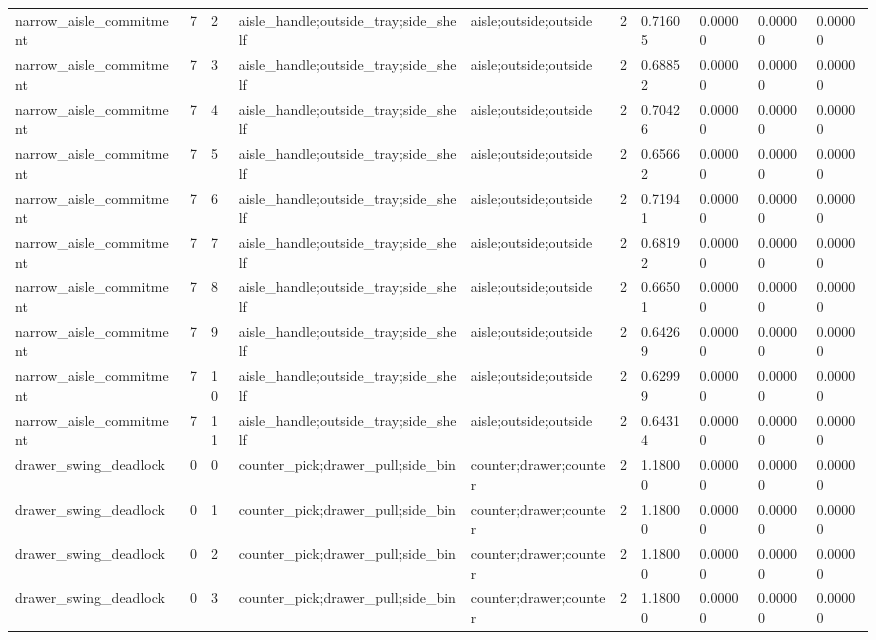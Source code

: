 \documentclass{article}
\begin{document}
\begin{table}[tbp]
{\begin{tabular}{llllllllll}
narrow\_aisle\_commitment & 7 & 2 & aisle\_handle;outside\_tray;side\_shelf & aisle;outside;outside & 2 & 0.71605 & 0.00000 & 0.00000 & 0.00000 \\
narrow\_aisle\_commitment & 7 & 3 & aisle\_handle;outside\_tray;side\_shelf & aisle;outside;outside & 2 & 0.68852 & 0.00000 & 0.00000 & 0.00000 \\
narrow\_aisle\_commitment & 7 & 4 & aisle\_handle;outside\_tray;side\_shelf & aisle;outside;outside & 2 & 0.70426 & 0.00000 & 0.00000 & 0.00000 \\
narrow\_aisle\_commitment & 7 & 5 & aisle\_handle;outside\_tray;side\_shelf & aisle;outside;outside & 2 & 0.65662 & 0.00000 & 0.00000 & 0.00000 \\
narrow\_aisle\_commitment & 7 & 6 & aisle\_handle;outside\_tray;side\_shelf & aisle;outside;outside & 2 & 0.71941 & 0.00000 & 0.00000 & 0.00000 \\
narrow\_aisle\_commitment & 7 & 7 & aisle\_handle;outside\_tray;side\_shelf & aisle;outside;outside & 2 & 0.68192 & 0.00000 & 0.00000 & 0.00000 \\
narrow\_aisle\_commitment & 7 & 8 & aisle\_handle;outside\_tray;side\_shelf & aisle;outside;outside & 2 & 0.66501 & 0.00000 & 0.00000 & 0.00000 \\
narrow\_aisle\_commitment & 7 & 9 & aisle\_handle;outside\_tray;side\_shelf & aisle;outside;outside & 2 & 0.64269 & 0.00000 & 0.00000 & 0.00000 \\
narrow\_aisle\_commitment & 7 & 10 & aisle\_handle;outside\_tray;side\_shelf & aisle;outside;outside & 2 & 0.62999 & 0.00000 & 0.00000 & 0.00000 \\
narrow\_aisle\_commitment & 7 & 11 & aisle\_handle;outside\_tray;side\_shelf & aisle;outside;outside & 2 & 0.64314 & 0.00000 & 0.00000 & 0.00000 \\
drawer\_swing\_deadlock & 0 & 0 & counter\_pick;drawer\_pull;side\_bin & counter;drawer;counter & 2 & 1.18000 & 0.00000 & 0.00000 & 0.00000 \\
drawer\_swing\_deadlock & 0 & 1 & counter\_pick;drawer\_pull;side\_bin & counter;drawer;counter & 2 & 1.18000 & 0.00000 & 0.00000 & 0.00000 \\
drawer\_swing\_deadlock & 0 & 2 & counter\_pick;drawer\_pull;side\_bin & counter;drawer;counter & 2 & 1.18000 & 0.00000 & 0.00000 & 0.00000 \\
drawer\_swing\_deadlock & 0 & 3 & counter\_pick;drawer\_pull;side\_bin & counter;drawer;counter & 2 & 1.18000 & 0.00000 & 0.00000 & 0.00000 \\

\end{tabular}}
\end{table}
\end{document}
